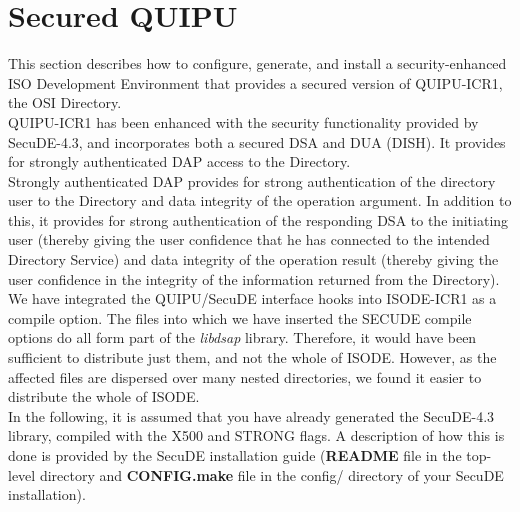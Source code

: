 \section{Secured QUIPU}
This section describes how to configure, generate, and install
a security-enhanced ISO Development Environment that provides a secured version of
QUIPU-ICR1, the OSI Directory. 
\\ [1em]
QUIPU-ICR1 has been enhanced with the security functionality provided by SecuDE-4.3, and 
incorporates both a secured DSA and DUA (DISH). It provides for strongly authenticated DAP access
to the Directory.
\\ [1em]
Strongly authenticated DAP provides for strong authentication of the directory user
to the Directory and data integrity of the operation argument. In addition to this, it 
provides for strong authentication of the responding DSA to the initiating user
(thereby giving the user confidence that he has connected to the intended Directory Service)
and data integrity of the operation result (thereby giving the user confidence in the
integrity of the information returned from the Directory).
\\ [1em]
We have integrated the QUIPU/SecuDE interface hooks into ISODE-ICR1 as a compile option.
The files into which we have inserted the SECUDE compile options do all form part
of the {\em libdsap} library. Therefore, it would have been sufficient to distribute
just them, and not the whole of ISODE. However, as the affected files are dispersed
over many nested directories, we found it easier to distribute the whole of ISODE.
\\ [1em]
In the following, it is assumed that you have already generated the SecuDE-4.3 library,
compiled with the X500 and STRONG flags. 
A description of how this is done is provided by the SecuDE installation guide
({\bf README} file in the top-level directory and {\bf CONFIG.make} file in the config/ directory of your SecuDE installation).


